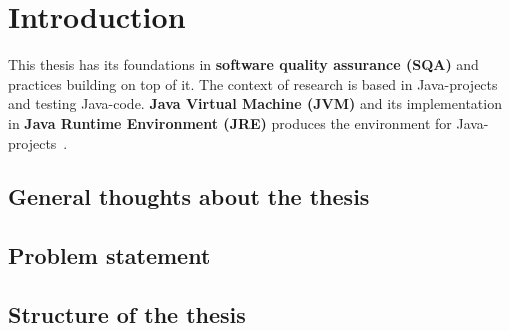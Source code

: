 \chapter{Introduction}
\label{chapter:intro}
This thesis has its foundations in \textbf{software quality assurance (SQA)} and practices building on top of it. The context of research
is based in Java-projects and testing Java-code. \textbf{Java Virtual Machine (JVM)} and its implementation in \textbf{Java Runtime Environment (JRE)}
produces the environment for Java-projects~\cite{wiki:jvm}.

\section{General thoughts about the thesis}
\section{Problem statement}
\section{Structure of the thesis}

